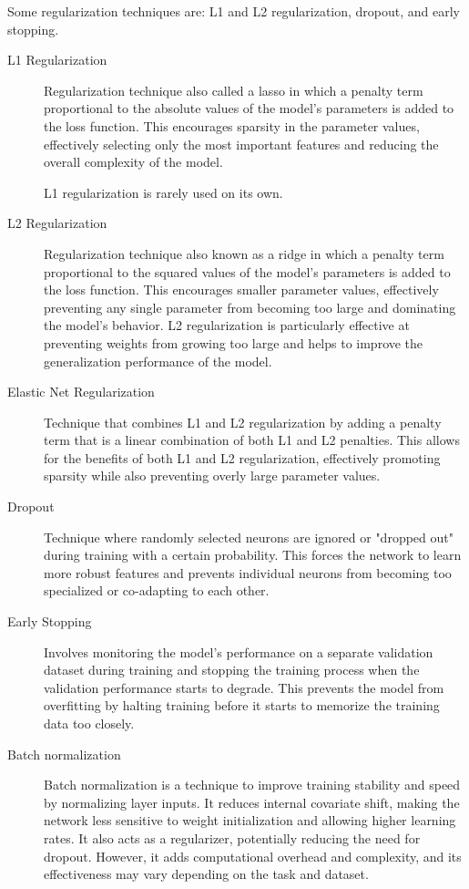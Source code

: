 \documentclass[a4paper]{report}
\begin{document}
Some regularization techniques are: L1 and L2 regularization, dropout, and early stopping.

\begin{description}
\item[L1 Regularization]
Regularization technique also called a lasso in which a penalty term proportional to the absolute values of the model's parameters is added to the loss function. This encourages sparsity in the parameter values, effectively selecting only the most important features and reducing the overall complexity of the model.

L1 regularization is rarely used on its own.

\item[L2 Regularization]
Regularization technique also known as a ridge in which a penalty term proportional to the squared values of the model's parameters is added to the loss function. This encourages smaller parameter values, effectively preventing any single parameter from becoming too large and dominating the model's behavior. L2 regularization is particularly effective at preventing weights from growing too large and helps to improve the generalization performance of the model.

\item[Elastic Net Regularization]
Technique that combines L1 and L2 regularization by adding a penalty term that is a linear combination of both L1 and L2 penalties. This allows for the benefits of both L1 and L2 regularization, effectively promoting sparsity while also preventing overly large parameter values.

\item[Dropout]
Technique where randomly selected neurons are ignored or "dropped out" during training with a certain probability. This forces the network to learn more robust features and prevents individual neurons from becoming too specialized or co-adapting to each other.

\item[Early Stopping]
Involves monitoring the model's performance on a separate validation dataset during training and stopping the training process when the validation performance starts to degrade. This prevents the model from overfitting by halting training before it starts to memorize the training data too closely.

\item[Batch normalization]
Batch normalization is a technique to improve training stability and speed by normalizing layer inputs. It reduces internal covariate shift, making the network less sensitive to weight initialization and allowing higher learning rates. It also acts as a regularizer, potentially reducing the need for dropout. However, it adds computational overhead and complexity, and its effectiveness may vary depending on the task and dataset.

\end{description}
\end{document}
